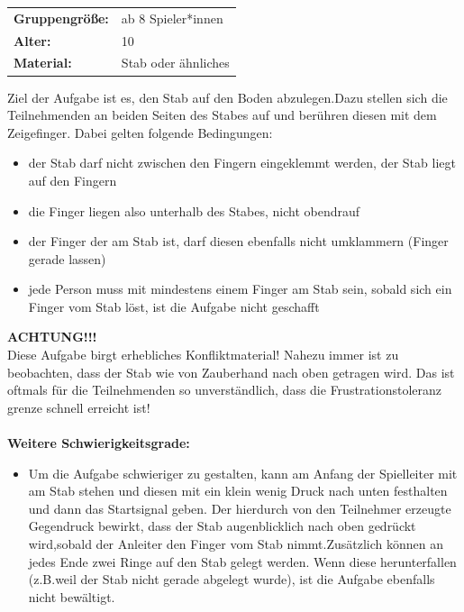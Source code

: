 \begin{table}[H]
\begin{tabular}{>{\bfseries}lp{8cm}}
   Gruppengröße:   & ab 8 Spieler*innen\\
    Alter: & 10 \\
    Material: & Stab oder ähnliches \\ 
\end{tabular}
\end{table} 
Ziel der Aufgabe ist es, den Stab auf den Boden abzulegen.Dazu stellen sich die Teilnehmenden an beiden Seiten des Stabes auf und berühren diesen mit dem Zeigefinger. Dabei gelten folgende Bedingungen:
\begin{itemize}
    \item der Stab darf nicht zwischen den Fingern eingeklemmt werden, der Stab liegt auf den Fingern
    \item die Finger liegen also unterhalb des Stabes, nicht obendrauf
    \item der Finger der am Stab ist, darf diesen ebenfalls nicht umklammern (Finger gerade lassen)
    \item jede Person muss mit mindestens einem Finger am Stab sein, sobald sich ein Finger vom Stab löst, ist die Aufgabe nicht geschafft
\end{itemize}

\textbf{ACHTUNG!!!}\\
Diese Aufgabe birgt erhebliches Konfliktmaterial! Nahezu immer ist zu beobachten, dass der Stab wie von Zauberhand nach oben getragen wird. Das ist oftmals für die Teilnehmenden so unverständlich, dass die Frustrationstoleranz grenze schnell erreicht ist!\\ \\
\textbf{Weitere Schwierigkeitsgrade:}
\begin{itemize}
    \item Um die Aufgabe schwieriger zu gestalten, kann am Anfang der Spielleiter mit am Stab stehen und diesen mit ein klein wenig Druck nach unten festhalten und dann das Startsignal geben. Der hierdurch von den Teilnehmer erzeugte Gegendruck bewirkt, dass der Stab augenblicklich nach oben gedrückt wird,sobald der Anleiter den Finger vom Stab nimmt.Zusätzlich können an jedes Ende zwei Ringe auf den Stab gelegt werden. Wenn diese herunterfallen (z.B.weil der Stab nicht gerade abgelegt wurde), ist die Aufgabe ebenfalls nicht bewältigt.
\end{itemize}

